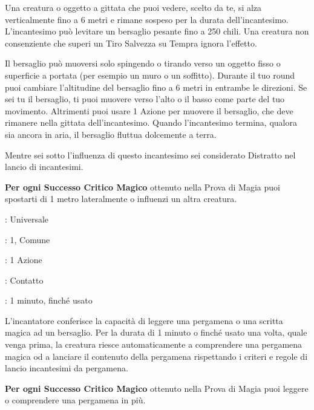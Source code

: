 \begin{multicols}{2}
Una creatura o oggetto a gittata che puoi vedere, scelto da te, si alza verticalmente fino a 6 metri e rimane sospeso per la durata dell'incantesimo. L'incantesimo può levitare un bersaglio pesante fino a 250 chili. Una creatura non consenziente che superi un Tiro Salvezza su Tempra ignora l'effetto.

Il bersaglio può muoversi solo spingendo o tirando verso un oggetto fisso o superficie a portata (per esempio un muro o un soffitto). Durante il tuo round puoi cambiare l'altitudine del bersaglio fino a 6 metri in entrambe le direzioni. Se sei tu il bersaglio, ti puoi muovere verso l'alto o il basso come parte del tuo movimento. Altrimenti puoi usare 1 Azione per muovere il bersaglio, che deve rimanere nella gittata dell'incantesimo. Quando l'incantesimo termina, qualora sia ancora in aria, il bersaglio fluttua dolcemente a terra.

Mentre sei sotto l'influenza di questo incantesimo sei considerato Distratto nel lancio di incantesimi.

\textbf{Per ogni Successo Critico Magico} ottenuto nella Prova di Magia puoi spostarti di 1 metro lateralmente o influenzi un altra creatura.

\noindent\colorbox{OBSSgold!10}{
\begin{minipage}{0.95\linewidth}
\begin{description}[noitemsep, topsep=0pt, parsep=0pt, partopsep=0pt, leftmargin=0cm, labelwidth=1.3cm]
	\item[\textbf{Lista}]: Universale
	\item[\textbf{Livello}]: 1, Comune
	\item[\textbf{Lancio}]: 1 Azione
	\item[\textbf{Gittata}]: Contatto
	\item[\textbf{Durata}]: 1 minuto, finché usato
\end{description}
\end{minipage}}\smallskip

L'incantatore conferisce la capacità di leggere una pergamena o una scritta magica ad un bersaglio. Per la durata di 1 minuto o finché usato una volta, quale venga prima, la creatura riesce automaticamente a comprendere una pergamena magica od a lanciare il contenuto della pergamena rispettando i criteri e regole di lancio incantesimi da pergamena.

\textbf{Per ogni Successo Critico Magico} ottenuto nella Prova di Magia puoi leggere o comprendere una pergamena in più.


\end{multicols}
